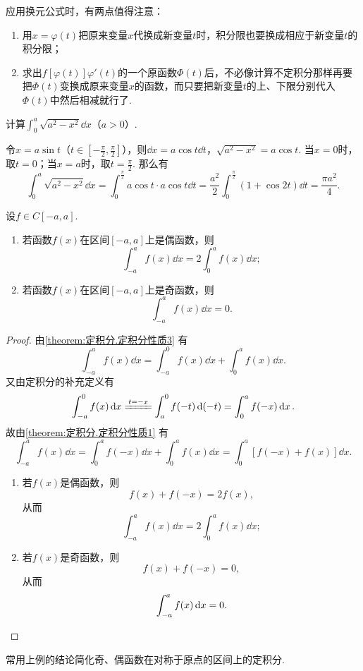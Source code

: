 应用换元公式时，有两点值得注意：\begin{enumerate}
\item 用\(x = \varphi(t)\)把原来变量\(x\)代换成新变量\(t\)时，积分限也要换成相应于新变量\(t\)的积分限；
\item 求出\(f[\varphi(t)] \varphi'(t)\)的一个原函数\(\Phi(t)\)后，不必像计算不定积分那样再要把\(\Phi(t)\)变换成原来变量\(x\)的函数，而只要把新变量\(t\)的上、下限分别代入\(\Phi(t)\)中然后相减就行了.
\end{enumerate}

\begin{example}
计算\(\int_0^a{\sqrt{a^2-x^2} \dd{x}}\)（\(a > 0\)）.
\begin{solution}
令\(x = a \sin t\)（\(t \in [-\frac{\pi}{2},\frac{\pi}{2}]\)），则\(\dd{x} = a \cos t \dd{t}\)，\(\sqrt{a^2-x^2} = a \cos t\).
当\(x = 0\)时，取\(t = 0\)；当\(x = a\)时，取\(t = \frac{\pi}{2}\).
那么有\[
\int_0^a{\sqrt{a^2-x^2} \dd{x}}
= \int_0^{\frac{\pi}{2}}{a \cos t \cdot a \cos t \dd{t}}
= \frac{a^2}{2} \int_0^{\frac{\pi}{2}}{(1+\cos 2 t) \dd{t}}
= \frac{\pi a^2}{4}.
\]
\end{solution}
\end{example}

\begin{corollary}
设\(f \in C[-a,a]\).
\begin{enumerate}
\item 若函数\(f(x)\)在区间\([-a,a]\)上是偶函数，则\[
\int_{-a}^a f(x) \dd{x} = 2 \int_0^a f(x) \dd{x};
\]

\item 若函数\(f(x)\)在区间\([-a,a]\)上是奇函数，则\[
\int_{-a}^a f(x) \dd{x} = 0.
\]
\end{enumerate}
\begin{proof}
由\cref{theorem:定积分.定积分性质3} 有\[
\int_{-a}^a f(x) \dd{x} = \int_{-a}^0 f(x) \dd{x} + \int_0^a f(x) \dd{x}.
\]又由定积分的补充定义有\[
\int_{-a}^0 f(x) \dd{x}
\xlongequal{t=-x} \int_a^0 f(-t) \dd(-t)
= \int_0^a f(-x) \dd{x}.
\]故由\cref{theorem:定积分.定积分性质1} 有\[
\int_{-a}^a f(x) \dd{x}
= \int_0^a f(-x) \dd{x} + \int_0^a f(x) \dd{x}
= \int_0^a [f(-x) + f(x)] \dd{x}.
\]

\begin{enumerate}
\item 若\(f(x)\)是偶函数，则\[
f(x) + f(-x) = 2 f(x),
\]从而\[
\int_{-a}^a f(x) \dd{x} = 2 \int_0^a f(x) \dd{x};
\]

\item 若\(f(x)\)是奇函数，则\[
f(x) + f(-x) = 0,
\]从而\[
\int_{-a}^a f(x) \dd{x} = 0.
\qedhere
\]
\end{enumerate}
\end{proof}
\end{corollary}
常用上例的结论简化奇、偶函数在对称于原点的区间上的定积分.


